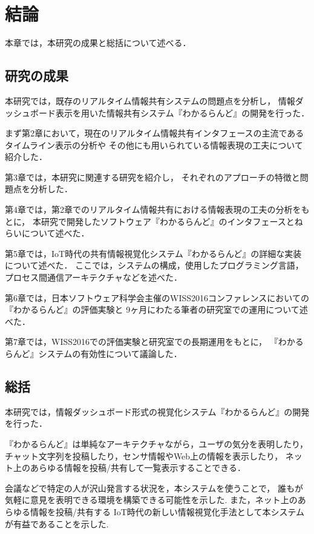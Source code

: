 \chapter{結論}
\label{chap:conclusion}

本章では，本研究の成果と総括について述べる．

\newpage

\section{研究の成果}

本研究では，既存のリアルタイム情報共有システムの問題点を分析し，
情報ダッシュボード表示を用いた情報共有システム『わかるらんど』の開発を行った．

まず第2章において，現在のリアルタイム情報共有インタフェースの主流であるタイムライン表示の分析や
その他にも用いられている情報表現の工夫について紹介した．

第3章では，本研究に関連する研究を紹介し，
それぞれのアプローチの特徴と問題点を分析した．

第4章では，第2章でのリアルタイム情報共有における情報表現の工夫の分析をもとに，
本研究で開発したソフトウェア『わかるらんど』のインタフェースとねらいについて述べた．

第5章では，IoT時代の共有情報視覚化システム『わかるらんど』の詳細な実装について述べた．
ここでは，システムの構成，使用したプログラミング言語，プロセス間通信アーキテクチャなどを述べた．

第6章では，日本ソフトウェア科学会主催のWISS2016コンファレンスにおいての『わかるらんど』の評価実験と
9ヶ月にわたる筆者の研究室での運用について述べた．

第7章では，WISS2016での評価実験と研究室での長期運用をもとに，
『わかるらんど』システムの有効性について議論した．

\section{総括}

本研究では，情報ダッシュボード形式の視覚化システム『わかるらんど』の開発を行った．

『わかるらんど』は単純なアーキテクチャながら，ユーザの気分を表明したり，
チャット文字列を投稿したり，センサ情報やWeb上の情報を表示したり，
ネット上のあらゆる情報を投稿/共有して一覧表示することできる．

会議などで特定の人が沢山発言する状況を，本システムを使うことで，
誰もが気軽に意見を表明できる環境を構築できる可能性を示した.
また，ネット上のあらゆる情報を投稿/共有する
IoT時代の新しい情報視覚化手法として本システムが有益であることを示した.